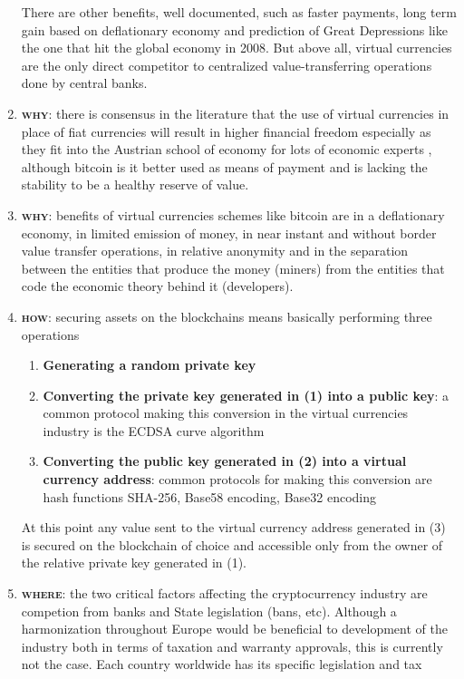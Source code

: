 \documentclass[11pt,fleqn]{book} %
\begin{document}
\begin{enumerate}
	There are other benefits, well documented, such as faster payments, long term gain based on deflationary economy and prediction of 
	Great Depressions like the one that hit the global economy in 2008. But
	above all, virtual currencies are the only direct competitor to centralized value-transferring operations done by central banks.
	\item \textbf{\textsc{why}}: there is consensus in the literature that the use of virtual currencies in place of fiat currencies will result in 
	higher financial freedom especially as they fit into the Austrian school of economy \cite{austrianTheory} for lots of economic experts
	\cite{misesItalia}, although bitcoin is it better used as means of payment and is lacking the stability to be a healthy
	reserve of value.
	\item \textbf{\textsc{why}}: benefits of virtual currencies schemes like bitcoin are in a deflationary economy, in limited emission of money,
	in near instant and without border value transfer operations, in relative anonymity and in the separation between the entities 
	that produce the money (miners) from the entities that code the economic theory behind it (developers).
	\item \textbf{\textsc{how}}: securing assets on the blockchains means basically performing three operations
		\begin{enumerate}[label*=\arabic*.]
			\item \textbf{Generating a random private key}
			\item \textbf{Converting the private key generated in (1) into a public key}: a common protocol making this conversion
			in the virtual currencies industry is the ECDSA curve algorithm
			\item \textbf{Converting the public key generated in (2) into a virtual currency address}: common protocols for making this conversion
			are hash functions SHA-256, Base58 encoding, Base32 encoding
		\end{enumerate}
	At this point any value sent to the virtual currency address generated in (3) is secured on the blockchain of choice and accessible
	only from the owner of the relative private key generated in (1).
	\item \textbf{\textsc{where}}: the two critical factors affecting the cryptocurrency industry are competion from banks and 
	State legislation (bans, etc).
	Although a harmonization throughout Europe would be beneficial to development of the industry both in terms of 
	taxation and warranty approvals, this is currently not the case. Each country worldwide has its specific legislation and tax

\end{enumerate}
\end{document}
